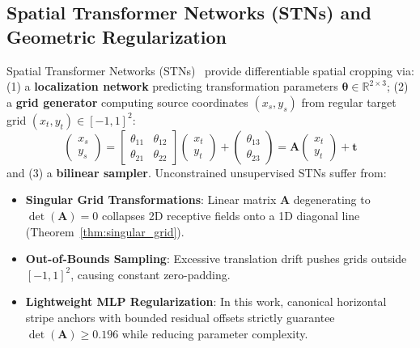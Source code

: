 \subsection{Spatial Transformer Networks (STNs) and Geometric Regularization}
\label{subsec:stn_lit}

Spatial Transformer Networks (STNs)~\cite{jaderberg2015spatial} provide differentiable spatial cropping via: (1) a \textbf{localization network} predicting transformation parameters $\boldsymbol{\theta} \in \mathbb{R}^{2 \times 3}$; (2) a \textbf{grid generator} computing source coordinates $(x_s, y_s)$ from regular target grid $(x_t, y_t) \in [-1, 1]^2$:
\begin{equation}
\label{eq:lit_stn_grid}
\begin{pmatrix} x_s \\ y_s \end{pmatrix} = \begin{bmatrix} \theta_{11} & \theta_{12} \\ \theta_{21} & \theta_{22} \end{bmatrix} \begin{pmatrix} x_t \\ y_t \end{pmatrix} + \begin{pmatrix} \theta_{13} \\ \theta_{23} \end{pmatrix} = \mathbf{A} \begin{pmatrix} x_t \\ y_t \end{pmatrix} + \mathbf{t}
\end{equation}
and (3) a \textbf{bilinear sampler}. Unconstrained unsupervised STNs suffer from:
\begin{itemize}[leftmargin=*]
    \item \textbf{Singular Grid Transformations}: Linear matrix $\mathbf{A}$ degenerating to $\det(\mathbf{A}) = 0$ collapses 2D receptive fields onto a 1D diagonal line (Theorem~\ref{thm:singular_grid}).
    \item \textbf{Out-of-Bounds Sampling}: Excessive translation drift pushes grids outside $[-1, 1]^2$, causing constant zero-padding.
    \item \textbf{Lightweight MLP Regularization}: In this work, canonical horizontal stripe anchors with bounded residual offsets strictly guarantee $\det(\mathbf{A}) \ge 0.196$ while reducing parameter complexity.
\end{itemize}

